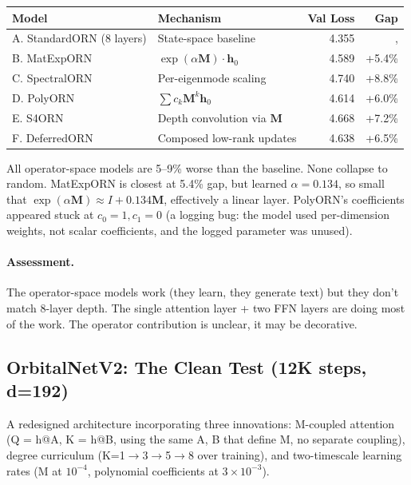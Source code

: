 \documentclass[11pt, a4paper]{article}
\newcommand{\M}{\mathbf{M}}
\newcommand{\h}{\mathbf{h}}
\theoremstyle{plain}
\theoremstyle{definition}
\theoremstyle{remark}
\begin{document}
\begin{center}\small
\begin{tabular}{llrr}
\toprule
\textbf{Model} & \textbf{Mechanism} & \textbf{Val Loss} & \textbf{Gap} \\
\midrule
A. StandardORN (8 layers) & State-space baseline & 4.355 & ,  \\
B. MatExpORN & $\exp(\alpha \M) \cdot \h_0$ & 4.589 & +5.4\% \\
C. SpectralORN & Per-eigenmode scaling & 4.740 & +8.8\% \\
D. PolyORN & $\sum c_k \M^k \h_0$ & 4.614 & +6.0\% \\
E. S4ORN & Depth convolution via $\M$ & 4.668 & +7.2\% \\
F. DeferredORN & Composed low-rank updates & 4.638 & +6.5\% \\
\bottomrule
\end{tabular}
\end{center}

All operator-space models are 5--9\% worse than the baseline.
None collapse to random.
MatExpORN is closest at 5.4\% gap, but learned $\alpha = 0.134$, so small that $\exp(\alpha \M) \approx I + 0.134\M$, effectively a linear layer.
PolyORN's coefficients appeared stuck at $c_0 = 1, c_1 = 0$ (a logging bug: the model used per-dimension weights, not scalar coefficients, and the logged parameter was unused).

\paragraph{Assessment.}
The operator-space models work (they learn, they generate text) but they don't match 8-layer depth.
The single attention layer + two FFN layers are doing most of the work.
The operator contribution is unclear, it may be decorative.

\subsection{OrbitalNetV2: The Clean Test (12K steps, d=192)}

A redesigned architecture incorporating three innovations: M-coupled attention (Q = h@A, K = h@B, using the same A, B that define M, no separate coupling), degree curriculum (K=1$\to$3$\to$5$\to$8 over training), and two-timescale learning rates (M at $10^{-4}$, polynomial coefficients at $3 \times 10^{-3}$).
\end{document}
